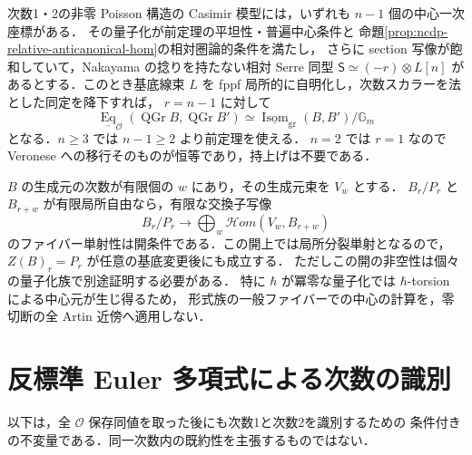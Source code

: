 \begin{corollary}[一般次元への適用の形]
\label{cor:ncdp-veronese-dp}
次数1・2の非零 Poisson 構造の Casimir 模型には，いずれも $n-1$ 個の中心一次座標がある．
その量子化が前定理の平坦性・普遍中心条件と
命題\ref{prop:ncdp-relative-anticanonical-hom}の相対圏論的条件を満たし，
さらに section 写像が飽和していて，Nakayama の捻りを持たない相対 Serre 同型
$\mathsf S\simeq(-r)\otimes L[n]$ があるとする．このとき基底線束 $L$ を
fppf 局所的に自明化し，次数スカラーを法とした同定を降下すれば，
$r=n-1$ に対して
\[
 \underline{\operatorname{Eq}}_{\mathcal O}(\operatorname{QGr}B,
       \operatorname{QGr}B')
 \simeq
 \underline{\operatorname{Isom}}_{\mathrm{gr}}(B,B')/\mathbb G_m
\]
となる．$n\ge3$ では $n-1\ge2$ より前定理を使える．
$n=2$ では $r=1$ なので Veronese への移行そのものが恒等であり，持上げは不要である．
\end{corollary}

\begin{remark}[中心条件の確認と適用範囲]
$B$ の生成元の次数が有限個の $w$ にあり，その生成元束を $V_w$ とする．
$B_r/P_r$ と $B_{r+w}$ が有限局所自由なら，有限な交換子写像
\[
 B_r/P_r\longrightarrow
 \bigoplus_w\mathcal Hom(V_w,B_{r+w})
\]
のファイバー単射性は開条件である．この開上では局所分裂単射となるので，
$Z(B)_r=P_r$ が任意の基底変更後にも成立する．
ただしこの開の非空性は個々の量子化族で別途証明する必要がある．
特に $\hbar$ が冪零な量子化では $\hbar$-torsion による中心元が生じ得るため，
形式族の一般ファイバーでの中心の計算を，零切断の全 Artin 近傍へ適用しない．
\end{remark}

\section{反標準 Euler 多項式による次数の識別}
\label{sec:ncdp-intrinsic-degree}

以下は，全 $\mathcal O$ 保存同値を取った後にも次数1と次数2を識別するための
条件付きの不変量である．同一次数内の既約性を主張するものではない．

